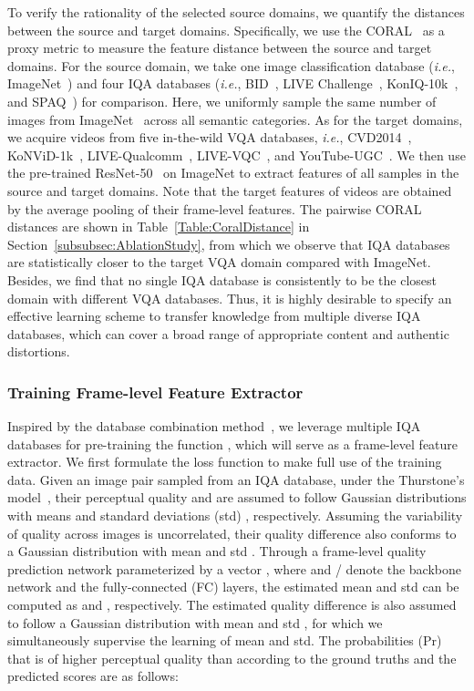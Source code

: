\documentclass[journal]{IEEEtran}
\begin{document}
To verify the rationality of the selected source domains, we quantify the distances between the source and target domains. Specifically, we use the CORAL~\cite{sun2016deep} as a proxy metric to measure the feature distance between the source and target domains. For the source domain, we take one image classification database (\textit{i.e.}, ImageNet~\cite{deng2009imagenet}) and four IQA databases (\textit{i.e.}, BID~\cite{ciancio2010no}, LIVE Challenge~\cite{ghadiyaram2016massive}, KonIQ-10k~\cite{hosu2020koniq}, and SPAQ~\cite{fang2020perceptual}) for comparison. Here, we uniformly sample the same number of images from ImageNet~\cite{deng2009imagenet} across all semantic categories. As for the target domains, we acquire videos from five in-the-wild VQA databases, \textit{i.e.}, CVD2014~\cite{nuutinen2016cvd2014}, KoNViD-1k~\cite{hosu2017konstanz}, LIVE-Qualcomm~\cite{ghadiyaram2018capture}, LIVE-VQC~\cite{sinno2019large}, and YouTube-UGC~\cite{wang2019youtube}. We then use the pre-trained ResNet-50~\cite{he2016deep} on ImageNet to extract features of all samples in the source and target domains. Note that the target features of videos are obtained by the average pooling of their frame-level features. The pairwise CORAL distances are shown in Table~\ref{Table:CoralDistance} in Section~\ref{subsubsec:AblationStudy}, from which we observe that IQA databases are statistically closer to the target VQA domain compared with ImageNet. Besides, we find that no single IQA database is consistently to be the closest domain with different VQA databases. Thus, it is highly desirable to specify an effective learning scheme to transfer knowledge from multiple diverse IQA databases, which can cover a broad range of appropriate content and authentic distortions.



\subsubsection{Training Frame-level Feature Extractor}\label{Subsubsec:QualityAwareLearning} Inspired by the database combination method~\cite{zhang2021uncertainty}, we leverage multiple IQA databases for pre-training the function , which will serve as a frame-level feature extractor. We first formulate the loss function  to make full use of the training data. Given an image pair  sampled from an IQA database, under the Thurstone's model~\cite{thurstone1927law}, their perceptual quality  and  are assumed to follow Gaussian distributions with means  and standard deviations (std) , respectively. Assuming the variability of quality across images is uncorrelated, their quality difference  also conforms to a Gaussian distribution with mean  and std . Through a frame-level quality prediction network  parameterized by a vector , where  and  /  denote the backbone network and the fully-connected (FC) layers, the estimated mean and std can be computed as  and , respectively. The estimated quality difference is also assumed to follow a Gaussian distribution with mean  and std , for which we simultaneously supervise the learning of mean and std. The probabilities (Pr) that  is of higher perceptual quality than  according to the ground truths and the predicted scores are as follows:
\end{document}
